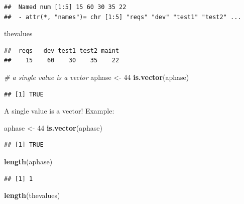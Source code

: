 \documentclass[]{book}
\newenvironment{Shaded}{\begin{snugshade}}{\end{snugshade}}
\newcommand{\KeywordTok}[1]{\textcolor[rgb]{0.13,0.29,0.53}{\textbf{{#1}}}}
\newcommand{\DecValTok}[1]{\textcolor[rgb]{0.00,0.00,0.81}{{#1}}}
\newcommand{\StringTok}[1]{\textcolor[rgb]{0.31,0.60,0.02}{{#1}}}
\newcommand{\CommentTok}[1]{\textcolor[rgb]{0.56,0.35,0.01}{\textit{{#1}}}}
\newcommand{\NormalTok}[1]{{#1}}
\begin{document}
\begin{verbatim}
##  Named num [1:5] 15 60 30 35 22
##  - attr(*, "names")= chr [1:5] "reqs" "dev" "test1" "test2" ...
\end{verbatim}

\begin{Shaded}
\begin{Highlighting}[]
\NormalTok{thevalues}
\end{Highlighting}
\end{Shaded}

\begin{verbatim}
##  reqs   dev test1 test2 maint 
##    15    60    30    35    22
\end{verbatim}

\begin{Shaded}
\begin{Highlighting}[]
\CommentTok{# a single value is a vector}
\NormalTok{aphase <-}\StringTok{ }\DecValTok{44}
\KeywordTok{is.vector}\NormalTok{(aphase)}
\end{Highlighting}
\end{Shaded}

\begin{verbatim}
## [1] TRUE
\end{verbatim}

A single value is a vector! Example:

\begin{Shaded}
\begin{Highlighting}[]
\NormalTok{aphase <-}\StringTok{ }\DecValTok{44}
\KeywordTok{is.vector}\NormalTok{(aphase)}
\end{Highlighting}
\end{Shaded}

\begin{verbatim}
## [1] TRUE
\end{verbatim}

\begin{Shaded}
\begin{Highlighting}[]
\KeywordTok{length}\NormalTok{(aphase)}
\end{Highlighting}
\end{Shaded}

\begin{verbatim}
## [1] 1
\end{verbatim}

\begin{Shaded}
\begin{Highlighting}[]
\KeywordTok{length}\NormalTok{(thevalues)}
\end{Highlighting}
\end{Shaded}
\end{document}

